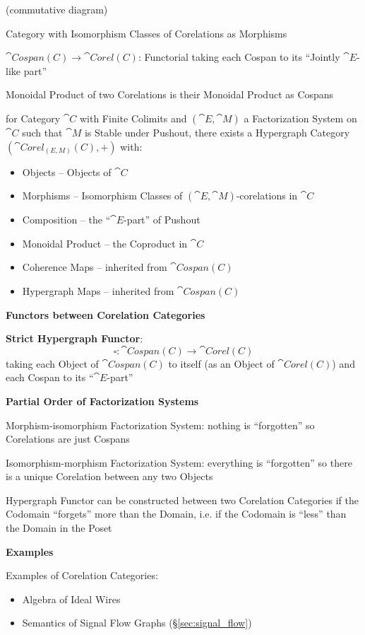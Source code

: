 (commutative diagram) %

Category with Isomorphism Classes of Corelations as Morphisms

$\cat{Cospan(C)} \rightarrow \cat{Corel(C)}$: Functorial taking each
Cospan to its ``Jointly $\cat{E}$-like part''

Monoidal Product of two Corelations is their Monoidal Product as
Cospans

for Category $\cat{C}$ with Finite Colimits and $(\cat{E},\cat{M})$ a
Factorization System on $\cat{C}$ such that $\cat{M}$ is Stable under
Pushout, there exists a Hypergraph Category $(\cat{Corel_{(E,M)}(C)},
+)$ with:
\begin{itemize}
  \item Objects -- Objects of $\cat{C}$
  \item Morphisms -- Isomorphism Classes of
    $(\cat{E},\cat{M})$-corelations in $\cat{C}$
  \item Composition -- the ``$\cat{E}$-part'' of Pushout %
  \item Monoidal Product -- the Coproduct in $\cat{C}$
  \item Coherence Maps -- inherited from $\cat{Cospan(C)}$
  \item Hypergraph Maps -- inherited from $\cat{Cospan(C)}$
\end{itemize}


\textbf{Functors between Corelation Categories}


\textbf{Strict Hypergraph Functor}:
\[
  \square : \cat{Cospan(C)} \rightarrow \cat{Corel(C)}
\]
taking each Object of $\cat{Cospan(C)}$ to itself (as an Object of
$\cat{Corel(C)}$) and each Cospan to its ``$\cat{E}$-part''


\textbf{Partial Order of Factorization Systems} %

Morphism-isomorphism Factorization System: nothing is ``forgotten'' so
Corelations are just Cospans

Isomorphism-morphism Factorization System: everything is ``forgotten''
so there is a unique Corelation between any two Objects

Hypergraph Functor can be constructed between two Corelation
Categories if the Codomain ``forgets'' more than the Domain, i.e. if
the Codomain is ``less'' than the Domain in the Poset


\textbf{Examples}

Examples of Corelation Categories:
\begin{itemize}
  \item Algebra of Ideal Wires
  \item Semantics of Signal Flow Graphs (\S\ref{sec:signal_flow})
\end{itemize}

